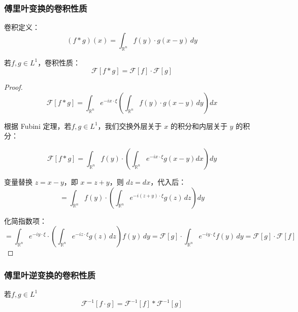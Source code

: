 \documentclass[12pt,a4paper]{article}
\numberwithin{subsection}{section}
\numberwithin{subsubsection}{subsection}
\theoremstyle{plain}
\theoremstyle{definition}
\theoremstyle{remark}
\begin{document}
	
	\subsubsection{傅里叶变换的卷积性质}
		卷积定义：
	\begin{equation}
		(f * g)(x) = \int_{\mathbb{R}^n} f(y) \cdot g(x - y) \, dy
	\end{equation}
	
	若\( f,g \in L^1 \)，卷积性质：
	\begin{equation}
		\mathcal{F}[f * g] = \mathcal{F}[f] \cdot \mathcal{F}[g]
	\end{equation}


		\begin{proof}
	\[	
		\mathcal{F}[f * g] = \int_{\mathbb{R}^n} e^{-i x \cdot \xi} \left( \int_{\mathbb{R}^n} f(y) \cdot g(x - y) \, dy \right) dx
	\]	
	
	
	根据 Fubini 定理，若\( f,g \in L^1 \)，我们交换外层关于 \(x\) 的积分和内层关于 \(y\) 的积分：
	
	\[
	\mathcal{F}[f * g] = \int_{\mathbb{R}^n} f(y) \cdot \left( \int_{\mathbb{R}^n} e^{-i x \cdot \xi} g(x - y) dx \right) dy
	\]
	
	变量替换 \( z = x - y \)，即 \( x = z + y \)，则 \( dz = dx \)，代入后：
	\[	
		= \int_{\mathbb{R}^n} f(y) \cdot \left( \int_{\mathbb{R}^n} e^{-i (z + y) \cdot \xi} g(z) \, dz \right) dy
	\]	
	
	化简指数项：
		\[	
		= \int_{\mathbb{R}^n} e^{-i y \cdot \xi} \cdot \left( \int_{\mathbb{R}^n} e^{-i z \cdot \xi} g(z) \, dz \right) f(y) \, dy	= \mathcal{F}[g] \cdot \int_{\mathbb{R}^n} e^{-i y \cdot \xi} f(y) \, dy = \mathcal{F}[g] \cdot \mathcal{F}[f]
	\]	
	
	
\end{proof}
	
		\subsubsection{傅里叶逆变换的卷积性质}
	若\( f,g \in L^1 \)
	\begin{equation}\label{nibianhuanjuanji}
		\mathcal{F}^{-1}[f \cdot g] = \mathcal{F}^{-1}[f] * \mathcal{F}^{-1}[g]
	\end{equation}
	
\end{document}
